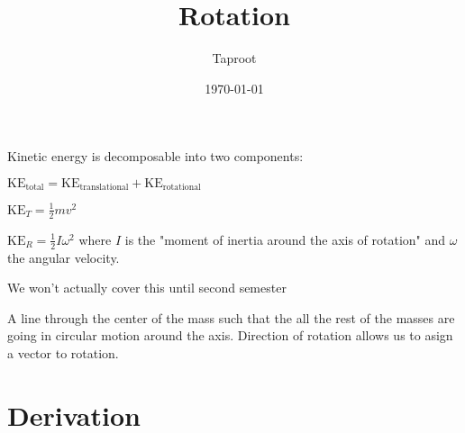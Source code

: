 \documentclass[letterpaper]{article}
\author{Taproot}
\date{\today}
\title{Rotation}
\renewcommand\maketitle{}
\begin{document}
\maketitle
Kinetic energy is decomposable into two components:

\(\text{KE}_{\text{total}} = \text{KE}_{\text{translational}} + \text{KE}_{\text{rotational}}\)

\(\text{KE}_T  = \frac{1}{2} mv^2\)

\begin{aside}
\(\text{KE}_R = \frac{1}{2} I\omega^2\) where \(I\) is the "moment of inertia around the axis of rotation" and \(\omega\) the angular velocity.

We won't actually cover this until second semester
\end{aside}

\begin{defn}
A line through the center of the mass such that the all the rest of the masses are going in circular motion around the axis. Direction of rotation allows us to asign a vector to rotation.
\end{defn}

\section{Derivation}
\label{sec:orgd7e64a1}
\end{document}
